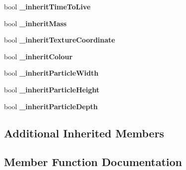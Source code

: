 \begin{DoxyCompactItemize}
bool {\bfseries \+\_\+inherit\+Time\+To\+Live}
\item 
\mbox{\label{classPUDoPlacementParticleEventHandler_a808ae51ee4bb1aac3249605a213d666b}} 
bool {\bfseries \+\_\+inherit\+Mass}
\item 
\mbox{\label{classPUDoPlacementParticleEventHandler_ae99deaad1170a24c52e028555f9c1cf0}} 
bool {\bfseries \+\_\+inherit\+Texture\+Coordinate}
\item 
\mbox{\label{classPUDoPlacementParticleEventHandler_ab93416f6367d8b2d3b888dc814d7eccf}} 
bool {\bfseries \+\_\+inherit\+Colour}
\item 
\mbox{\label{classPUDoPlacementParticleEventHandler_a551ea17f198041a3e73b765d0d7e63a0}} 
bool {\bfseries \+\_\+inherit\+Particle\+Width}
\item 
\mbox{\label{classPUDoPlacementParticleEventHandler_a0d4a9ffbc152a7a09d90694dc2281c60}} 
bool {\bfseries \+\_\+inherit\+Particle\+Height}
\item 
\mbox{\label{classPUDoPlacementParticleEventHandler_a4edfc80a180391971d8684b350ab4046}} 
bool {\bfseries \+\_\+inherit\+Particle\+Depth}
\end{DoxyCompactItemize}
\subsection*{Additional Inherited Members}


\subsection{Member Function Documentation}
\mbox{\label{classPUDoPlacementParticleEventHandler_a95a5ae60fc370645d6aae741235f03f0}} 
